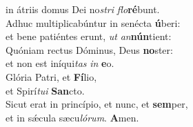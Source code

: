 \oddverse in átriis domus Dei no\textit{stri} \textit{flo}\textbf{ré}bunt.\\
\evenverse Adhuc multiplicabúntur in senécta \textbf{ú}beri:~\*\\
\evenverse et bene patiéntes erunt, \textit{ut} \textit{an}\textbf{nún}tient:\\
\oddverse Quóniam rectus Dóminus, Deus \textbf{no}ster:~\*\\
\oddverse et non est iníqui\textit{tas} \textit{in} \textbf{e}o.\\
\evenverse Glória Patri, et \textbf{Fí}lio,~\*\\
\evenverse et Spirí\textit{tu}\textit{i} \textbf{San}cto.\\
\oddverse Sicut erat in princípio, et nunc, et \textbf{sem}per,~\*\\
\oddverse et in sǽcula sæcu\textit{ló}\textit{rum}. \textbf{A}men.\\
